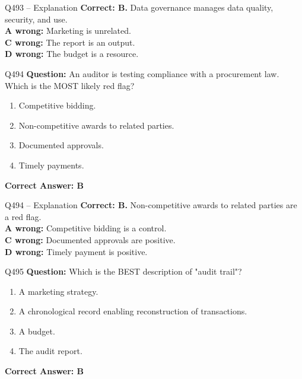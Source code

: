 \documentclass[aspectratio=169,10pt]{beamer}
\begin{document}
	\begin{frame}[t]{Q493 -- Explanation}
		\small
		\textbf{Correct: B.} Data governance manages data quality, security, and use. \\[4pt]
		\textbf{A wrong:} Marketing is unrelated. \\[2pt]
		\textbf{C wrong:} The report is an output. \\[2pt]
		\textbf{D wrong:} The budget is a resource.
	\end{frame}
	
	\begin{frame}[t]{Q494}
		\small
		\textbf{Question:} An auditor is testing compliance with a procurement law. Which is the MOST likely red flag?
		\begin{enumerate}[label=\Alph*.,itemsep=1pt,topsep=2pt]
			\item Competitive bidding.
			\item Non-competitive awards to related parties.
			\item Documented approvals.
			\item Timely payments.
		\end{enumerate}
		\vspace{4pt}
		\textbf{Correct Answer: B}
	\end{frame}
	
	\begin{frame}[t]{Q494 -- Explanation}
		\small
		\textbf{Correct: B.} Non-competitive awards to related parties are a red flag. \\[4pt]
		\textbf{A wrong:} Competitive bidding is a control. \\[2pt]
		\textbf{C wrong:} Documented approvals are positive. \\[2pt]
		\textbf{D wrong:} Timely payment is positive.
	\end{frame}
	
	\begin{frame}[t]{Q495}
		\small
		\textbf{Question:} Which is the BEST description of "audit trail"?
		\begin{enumerate}[label=\Alph*.,itemsep=1pt,topsep=2pt]
			\item A marketing strategy.
			\item A chronological record enabling reconstruction of transactions.
			\item A budget.
			\item The audit report.
		\end{enumerate}
		\vspace{4pt}
		\textbf{Correct Answer: B}
	\end{frame}
	
\end{document}
